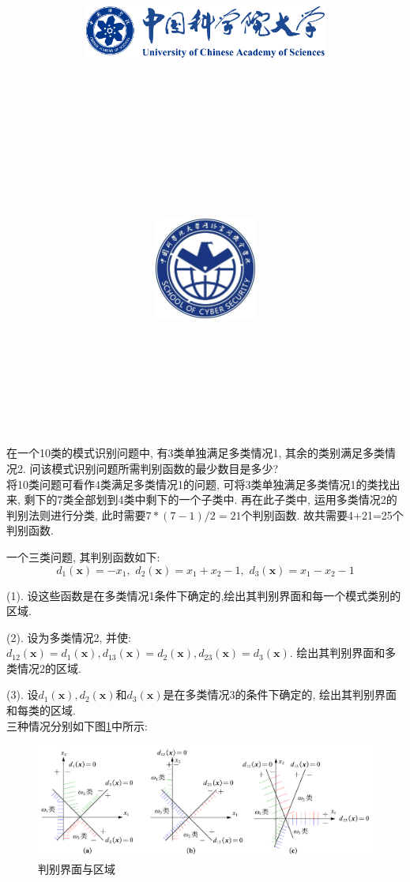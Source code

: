 \documentclass{article}
\title{
	\includegraphics[width=0.6\textwidth]{images/title/ucas_logo 1.pdf}\\
    \vspace{1in}
    \textmd{\textbf{\hmwkClass}}\\
	\textmd{\Large{\textbf{\hmwkClassID}}}\\
    \textmd{\textbf{\hmwkTitle}}\\
    \normalsize\vspace{0.1in}\large{\hmwkCompleteTime }\\
    \vspace{0.1in}\large{\textit{\hmwkClassInstructor\ }}\\
    \vspace{1in}
	\includegraphics[width=0.25\textwidth]{images/title/Cyber.jpg}\\
	\vspace{1in}
}
\author{
	\hmwkAuthorName \\ 
	\hmwkAuthorStuID \\
	\hmwkAuthorInst \\
	\hmwkAuthorzhuanye \\
	\hmwkAuthorfangxiang
	}
\date{}
\begin{document}
\maketitle


%
%
%
%
%


\pagebreak

\begin{homeworkProblem}
	在一个10类的模式识别问题中, 有3类单独满足多类情况1, 其余的类别满足多类情况2. 问该模式识别问题所需判别函数的最少数目是多少?
	\\

	\solution 将10类问题可看作4类满足多类情况1的问题, 可将3类单独满足多类情况1的类找出来, 剩下的7类全部划到4类中剩下的一个子类中. 再在此子类中, 运用多类情况2的判别法则进行分类, 此时需要$7\ast (7-1)/2=21$个判别函数. 故共需要4+21=25个判别函数.
\end{homeworkProblem}

\begin{homeworkProblem}
	一个三类问题, 其判别函数如下:
	$$d_1\left( \boldsymbol{x} \right) =-x_1,\,\, d_2\left( \boldsymbol{x} \right) =x_1+x_2-1,\,\, d_3\left( \boldsymbol{x} \right) =x_1-x_2-1
	$$

	(1). 设这些函数是在多类情况1条件下确定的,绘出其判别界面和每一个模式类别的区域.

	(2). 设为多类情况2, 并使: $d_{12}\left( \boldsymbol{x} \right) =d_1\left( \boldsymbol{x} \right) , d_{13}\left( \boldsymbol{x} \right) =d_2\left( \boldsymbol{x} \right) , d_{23}\left( \boldsymbol{x} \right) =d_3\left( \boldsymbol{x} \right)$. 绘出其判别界面和多类情况2的区域.

	(3). 设$d_1\left( \boldsymbol{x} \right) ,d_2\left( \boldsymbol{x} \right)$和$d_3\left( \boldsymbol{x} \right)$是在多类情况3的条件下确定的, 绘出其判别界面和每类的区域.
	\\

	\solution 三种情况分别如下图\ref{fig:判别界面与区域}中所示:

	\begin{figure}[H]  %
		\centering
		\includegraphics[width=1.0\textwidth]{images/title/判别界面与区域.pdf}
		\caption{判别界面与区域}
		\label{fig:判别界面与区域}
	\end{figure}
\end{homeworkProblem}
\end{document}
